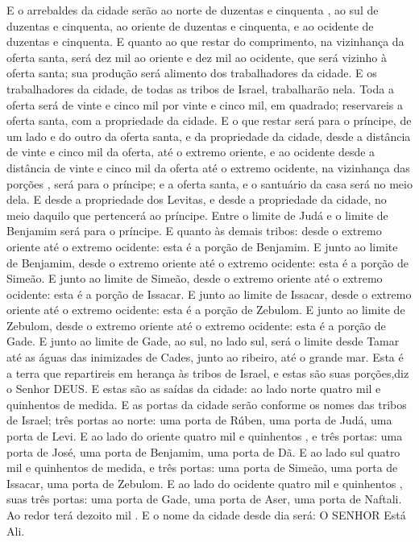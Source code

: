 {  E o arrebaldes da cidade serão ao norte de duzentas e cinquenta
{},  ao sul de duzentas e cinquenta, ao oriente de duzentas e cinquenta, e ao ocidente de duzentas e cinquenta.
  E quanto ao que restar do comprimento, na vizinhança da oferta santa, será dez mil
{} ao oriente e dez mil ao ocidente, que será vizinho à oferta santa; sua produção será alimento dos trabalhadores da cidade.
  E os trabalhadores da cidade, de todas as tribos de Israel, trabalharão nela.
  Toda a oferta será de vinte e cinco mil
{} por vinte e cinco mil, em quadrado; reservareis a oferta santa, com a propriedade da cidade.
  E o que restar será para o príncipe, de um lado e do outro da oferta santa, e da propriedade da cidade, desde a distância de vinte e cinco mil
{} da oferta, até o extremo oriente, e ao ocidente desde a distância de vinte e cinco mil
{} da oferta até o extremo ocidente, na vizinhança das porções
{},  será para o príncipe; e a oferta santa, e o santuário da casa será no meio dela.
  E desde a propriedade dos Levitas, e desde a propriedade da cidade,
{} no meio daquilo que pertencerá ao príncipe. Entre o limite de Judá e o limite de Benjamim será para o príncipe.
  E quanto às demais tribos: desde o extremo oriente até o extremo ocidente: esta é a porção de Benjamim.
  E junto ao limite de Benjamim, desde o extremo oriente até o extremo ocidente: esta é a porção de Simeão.
  E junto ao limite de Simeão, desde o extremo oriente até o extremo ocidente: esta é a porção de Issacar.
  E junto ao limite de Issacar, desde o extremo oriente até o extremo ocidente: esta é a porção de Zebulom.
  E junto ao limite de Zebulom, desde o extremo oriente até o extremo ocidente: esta é a porção de Gade.
  E junto ao limite de Gade, ao sul, no lado sul, será o limite desde Tamar até as águas das inimizades de Cades, junto ao ribeiro, até o grande mar.
  Esta é a terra que repartireis em herança às tribos de Israel, e estas são suas porções,diz o Senhor DEUS.
  E estas são as saídas da cidade: ao lado norte quatro mil e quinhentos
{} de medida.
  E as portas da cidade serão conforme os nomes das tribos de Israel; três portas ao norte: uma porta de Rúben, uma porta de Judá,
{} uma porta de Levi.
  E ao lado do oriente quatro mil e quinhentos
{},  e três portas: uma porta de José, uma porta de Benjamim,
{} uma porta de Dã.
  E ao lado sul quatro mil e quinhentos
{} de medida, e três portas: uma porta de Simeão, uma porta de Issacar,
{} uma porta de Zebulom.
  E ao lado do ocidente quatro mil e quinhentos
{}, {} suas três portas: uma porta de Gade, uma porta de Aser,
{} uma porta de Naftali.
  Ao redor terá dezoito mil
{} . E o nome da cidade desde
{} dia será: O SENHOR Está Ali.
\par }

